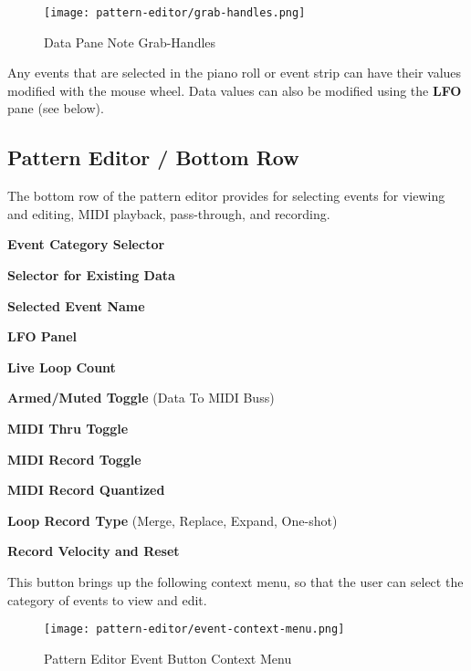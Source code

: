 \begin{itemize}
\begin{figure}[H]
   \centering 
   \texttt{[image: pattern-editor/grab-handles.png]}
   \caption{Data Pane Note Grab-Handles}
   \label{fig:pattern_editor_data_pane_note_grab_handles}
\end{figure}

   Any events that are selected in the piano roll or event strip can have
   their values modified with the mouse wheel.
   Data values can also be modified using the \textbf{LFO} pane (see below).

\subsection{Pattern Editor / Bottom Row}
\label{subsec:pattern_editor_bottom}

   The bottom row of the pattern editor provides for
   selecting events for viewing and editing, MIDI playback,
   pass-through, and recording.

   \begin{enumber}
      \item \textbf{Event Category Selector}
      \item \textbf{Selector for Existing Data}
      \item \textbf{Selected Event Name}
      \item \textbf{LFO Panel}
      \item \textbf{Live Loop Count}
      \item \textbf{Armed/Muted Toggle} (Data To MIDI Buss)
      \item \textbf{MIDI Thru Toggle}
      \item \textbf{MIDI Record Toggle}
      \item \textbf{MIDI Record Quantized}
      \item \textbf{Loop Record Type} (Merge, Replace, Expand, One-shot)
      \item \textbf{Record Velocity and Reset}
   \end{enumber}

   \setcounter{ItemCounter}{0}      %

   This button brings up the following context menu, so that the user can
   select the category of events to view and edit.

\begin{figure}[H]
   \centering 
   \texttt{[image: pattern-editor/event-context-menu.png]}
   \caption{Pattern Editor Event Button Context Menu}
   \label{fig:pattern_editor_bottom_event_context_menu}
\end{figure}


\end{itemize}
